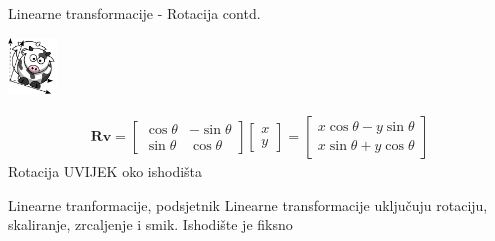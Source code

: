 \documentclass[9pt]{beamer}
\begin{document}
\begin{frame}{Linearne transformacije  - Rotacija contd.}
	\begin{center}
		\includegraphics[height=1.5cm]{slike/funny_cow_rotate.png}
	\end{center}
	
		\begin{align*}
		\mathbf{R} \mathbf{v}=  \left[ \begin{array}{cc} \cos\theta & -\sin\theta \\ 
		\sin\theta & \cos\theta  \end{array} \right] 
		\left[ \begin{array}{c} x \\ y  \end{array} \right] = 
		\left[ \begin{array}{c} x \cos\theta - y  \sin\theta\\ 
		x \sin\theta + y  \cos\theta  \end{array} \right]
		\end{align*}
	Rotacija UVIJEK oko ishodišta
	\begin{block}{Linearne tranformacije, podsjetnik}
			Linearne transformacije uključuju rotaciju, skaliranje, zrcaljenje i smik.
			Ishodište je fiksno
		\end{block}
	
\end{frame}
\end{document}
